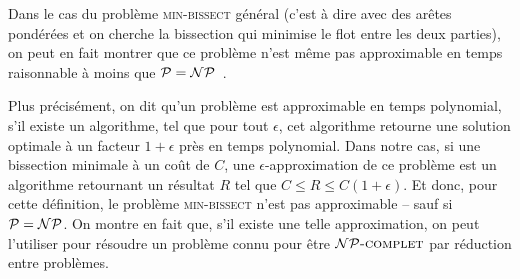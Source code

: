 \documentclass[fleqn,11pt, titlepage, french]{article}
\begin{document}
	Dans le cas du problème \textsc{min-bissect} général (c'est à dire avec des arêtes pondérées et on cherche la bissection qui minimise le flot entre les deux parties), on peut en fait montrer que ce problème n'est même pas approximable en temps raisonnable à moins que $\mathcal{P} = \mathcal{NP}$~\cite{noapprox}.
	
	Plus précisément, on dit qu'un problème est approximable en temps polynomial, s'il existe un algorithme, tel que pour tout $\epsilon$, cet algorithme retourne une solution optimale à un facteur $1+\epsilon$ près en temps polynomial. Dans notre cas, si une bissection minimale à un coût de $C$, une $\epsilon$-approximation de ce problème est un algorithme retournant un résultat $R$ tel que $C \leq R \leq C(1+\epsilon)$. Et donc, pour cette définition, le problème \textsc{min-bissect} n'est pas approximable -- sauf si $\mathcal{P} = \mathcal{NP}$. On montre en fait que, s'il existe une telle approximation, on peut l'utiliser pour résoudre un problème connu pour être $\mathcal{NP}\text{\textsc{-complet}}$ par réduction entre problèmes.	
	
	
	\newpage
	
	
	
	
\end{document}
